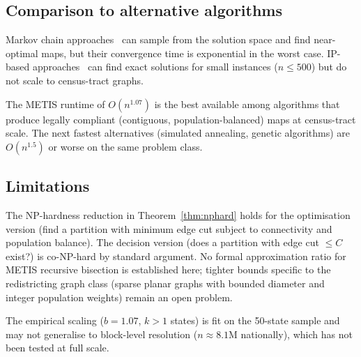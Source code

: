 \subsection{Comparison to alternative algorithms}

Markov chain approaches~\citep{fifield2020} can sample from the solution
space and find near-optimal maps, but their convergence time is
exponential in the worst case.  IP-based approaches~\citep{mehrotra1998optimal}
can find exact solutions for small instances ($n \leq 500$) but do not
scale to census-tract graphs.

The METIS runtime of $O(n^{1.07})$ is the best available among algorithms
that produce legally compliant (contiguous, population-balanced) maps at
census-tract scale.  The next fastest alternatives (simulated annealing,
genetic algorithms) are $O(n^{1.5})$ or worse on the same problem class.

\subsection{Limitations}

The NP-hardness reduction in Theorem~\ref{thm:nphard} holds for the
optimisation version (find a partition with minimum edge cut subject to
connectivity and population balance).
The decision version (does a partition with edge cut $\leq C$ exist?)
is co-NP-hard by standard argument.
No formal approximation ratio for METIS recursive bisection is established
here; tighter bounds specific to the redistricting graph class (sparse
planar graphs with bounded diameter and integer population weights) remain
an open problem.

The empirical scaling ($b = 1.07$, $k > 1$ states) is fit on the 50-state
sample and may not generalise to block-level resolution
($n \approx 8.1\mathrm{M}$ nationally), which has not been tested at
full scale.
